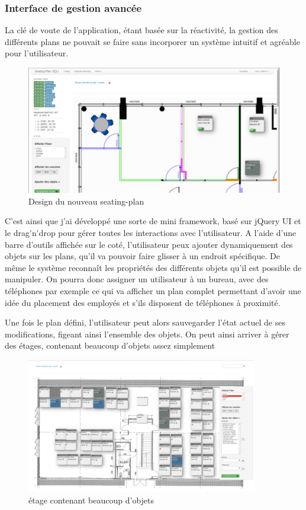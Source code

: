 \documentclass{report}
\begin{document}
\subsubsection{Interface de gestion avancée}
La clé de voute de l'application, étant basée sur la réactivité, la gestion des différents plans ne pouvait se faire sans incorporer un système intuitif et agréable pour l'utilisateur. 

\begin{figure}[h!]
	\centering
	\includegraphics[width=1\textwidth]{assets/screenshot/design.png}
	\caption{Design du nouveau seating-plan}
\end{figure}
C'est ainsi que j'ai développé une sorte de mini \gls{framework}, basé sur \gls{jQuery UI} et le \gls{drag'n'drop} pour gérer toutes les interactions avec l'utilisateur. 
A l'aide d'une barre d'outils affichée sur le coté, l'utilisateur peux ajouter dynamiquement des objets sur les plans, qu'il va pouvoir faire glisser à un endroit spécifique. 
De même le système reconnaît les propriétés des différents objets qu'il est possible de manipuler. On pourra donc assigner un utilisateur à un bureau, avec des téléphones par exemple ce qui va afficher un plan complet  permettant d'avoir une idée du placement des employés et s'ils disposent de téléphones à proximité.  

Une fois le plan défini, l'utilisateur peut alors sauvegarder l'état actuel de ses modifications, figeant ainsi l'ensemble des objets. 
On peut ainsi arriver à gérer des étages, contenant beaucoup d'objets assez simplement 

\begin{figure}[h!]
	\centering
	\includegraphics[width=0.9\textwidth]{assets/screenshot/plan_global.png}
	\caption{étage contenant beaucoup d'objets}
\end{figure}
\end{document}
